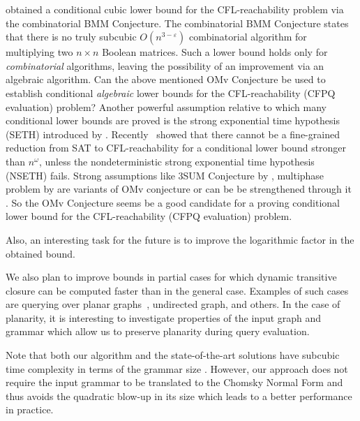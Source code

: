 \cite{10.1145/3158118} obtained a conditional cubic lower bound for the CFL-reachability problem via the combinatorial BMM Conjecture. The combinatorial BMM Conjecture states that there is no truly subcubic $O(n^{3-\varepsilon})$ combinatorial algorithm for multiplying two $n \times n$ Boolean matrices. Such a lower bound holds only for \textit{combinatorial} algorithms, leaving the possibility of an improvement via
an algebraic algorithm. Can the above mentioned OMv Conjecture be used to establish conditional \textit{algebraic} lower bounds for the CFL-reachability (CFPQ evaluation) problem? Another powerful assumption relative to which many conditional lower bounds are proved is the strong exponential time hypothesis (SETH) introduced by \cite{IMPAGLIAZZO2001367}. Recently~\cite{chistikov2021subcubic} showed that there cannot be a fine-grained reduction from SAT to CFL-reachability for a conditional lower bound stronger than $n^{\omega}$, unless the nondeterministic strong exponential time hypothesis (NSETH) fails. Strong assumptions like 3SUM Conjecture by \cite{Gajentaan1995OnAC}, multiphase problem by \cite{Patrascu} are variants of OMv conjecture or can be be strengthened through it \citep{10.1145/2746539.2746609}. So the OMv Conjecture seems be a good candidate for a proving conditional lower bound for the CFL-reachability (CFPQ evaluation) problem.


Also, an interesting task for the future is to improve the logarithmic factor in the obtained bound.


We also plan to improve bounds in partial cases for which dynamic transitive closure can be computed faster than in the general case.
Examples of such cases are querying over planar graphs~\citep{10.1007/3-540-57273-2_72}, undirected graph, and others.
In the case of planarity, it is interesting to investigate properties of the input graph and grammar which allow us to preserve planarity during query evaluation.

Note that both our algorithm and the state-of-the-art solutions have subcubic time complexity in terms of the grammar size \citep{Azimov:2018:CPQ:3210259.3210264, hellingsRelational, hellingsPathQuerying, 10.1145/258994.259006, 10.1145/3398682.3399163}.
However, our approach does not require the input grammar to be translated to the Chomsky Normal Form and thus avoids the quadratic blow-up in its size which leads to a better performance in practice.


